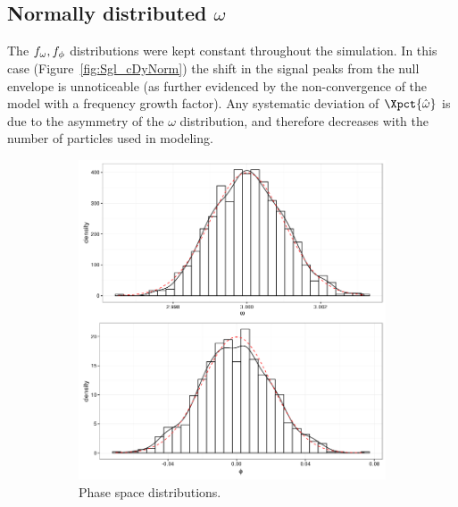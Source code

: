\documentclass{article}
\begin{document}
\subsection{Normally distributed $\omega$}
The $f_{\omega},f_{\phi}$ distributions were kept constant throughout the simulation. In this case (Figure~\ref{fig:Sgl_cDyNorm}) the shift in the signal peaks from the null envelope is unnoticeable (as further evidenced by the non-convergence of the model with a frequency growth factor). Any systematic deviation of $\Xpct{\hat{\omega}}$ is due to the asymmetry of the $\omega$ distribution, and therefore decreases with the number of particles used in modeling.
\begin{figure}[h]
	\begin{subfigure}{.5\textwidth}
		\centering
		\includegraphics[scale=.5]{../img/PS_dist_Norm}
		\caption{Phase space distributions.}
	\end{subfigure}~
	\begin{subfigure}{.5\textwidth}
		\centering

\end{subfigure}
\end{figure}
\end{document}
